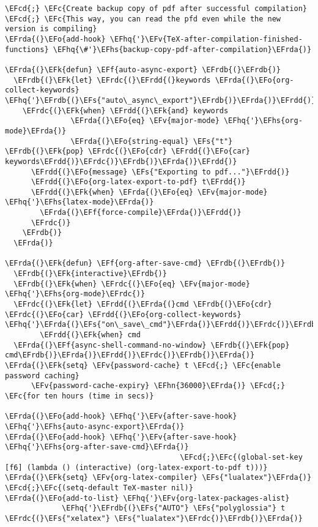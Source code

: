 \documentclass[a4wide,10pt]{article}
\newcommand{\EFc}[1]{\textcolor{EFc}{#1}} %
\newcommand{\EFcd}[1]{\textcolor{EFcd}{#1}} %
\newcommand{\EFs}[1]{\textcolor{EFs}{#1}} %
\newcommand{\EFk}[1]{\textcolor{EFk}{#1}} %
\newcommand{\EFf}[1]{\textcolor{EFf}{#1}} %
\newcommand{\EFv}[1]{\textcolor{EFv}{#1}} %
\newcommand{\EFo}[1]{\textcolor{EFo}{#1}} %
\newcommand{\EFhn}[1]{\textcolor{EFhn}{\textbf{#1}}} %
\newcommand{\EFhq}[1]{\textcolor{EFhq}{#1}} %
\newcommand{\EFhs}[1]{\textcolor{EFhs}{#1}} %
\newcommand{\EFrda}[1]{\textcolor{EFrda}{#1}} %
\newcommand{\EFrdb}[1]{\textcolor{EFrdb}{#1}} %
\newcommand{\EFrdc}[1]{\textcolor{EFrdc}{#1}} %
\newcommand{\EFrdd}[1]{\textcolor{EFrdd}{#1}} %
\begin{document}
\begin{Code}
\begin{Verbatim}
\EFcd{;} \EFc{Create backup copy of pdf after successful compilation}
\EFcd{;} \EFc{This way, you can read the pfd even while the new version is compiling}
\EFrda{(}\EFo{add-hook} \EFhq{'}\EFv{TeX-after-compilation-finished-functions} \EFhq{\#'}\EFhs{backup-copy-pdf-after-compilation}\EFrda{)}

\EFrda{(}\EFk{defun} \EFf{auto-async-export} \EFrdb{(}\EFrdb{)}
  \EFrdb{(}\EFk{let} \EFrdc{(}\EFrdd{(}keywords \EFrda{(}\EFo{org-collect-keywords} \EFhq{'}\EFrdb{(}\EFs{"auto\_async\_export"}\EFrdb{)}\EFrda{)}\EFrdd{)}\EFrdc{)}
    \EFrdc{(}\EFk{when} \EFrdd{(}\EFk{and} keywords
               \EFrda{(}\EFo{eq} \EFv{major-mode} \EFhq{'}\EFhs{org-mode}\EFrda{)}
               \EFrda{(}\EFo{string-equal} \EFs{"t"} \EFrdb{(}\EFk{pop} \EFrdc{(}\EFo{cdr} \EFrdd{(}\EFo{car} keywords\EFrdd{)}\EFrdc{)}\EFrdb{)}\EFrda{)}\EFrdd{)}
      \EFrdd{(}\EFo{message} \EFs{"Exporting to pdf..."}\EFrdd{)}
      \EFrdd{(}\EFo{org-latex-export-to-pdf} t\EFrdd{)}
      \EFrdd{(}\EFk{when} \EFrda{(}\EFo{eq} \EFv{major-mode} \EFhq{'}\EFhs{latex-mode}\EFrda{)}
        \EFrda{(}\EFf{force-compile}\EFrda{)}\EFrdd{)}
      \EFrdc{)}
    \EFrdb{)}
  \EFrda{)}

\EFrda{(}\EFk{defun} \EFf{org-after-save-cmd} \EFrdb{(}\EFrdb{)}
  \EFrdb{(}\EFk{interactive}\EFrdb{)}
  \EFrdb{(}\EFk{when} \EFrdc{(}\EFo{eq} \EFv{major-mode} \EFhq{'}\EFhs{org-mode}\EFrdc{)}
  \EFrdc{(}\EFk{let} \EFrdd{(}\EFrda{(}cmd \EFrdb{(}\EFo{cdr} \EFrdc{(}\EFo{car} \EFrdd{(}\EFo{org-collect-keywords} \EFhq{'}\EFrda{(}\EFs{"on\_save\_cmd"}\EFrda{)}\EFrdd{)}\EFrdc{)}\EFrdb{)}\EFrda{)}\EFrdd{)}
        \EFrdd{(}\EFk{when} cmd
  \EFrda{(}\EFf{async-shell-command-no-window} \EFrdb{(}\EFk{pop} cmd\EFrdb{)}\EFrda{)}\EFrdd{)}\EFrdc{)}\EFrdb{)}\EFrda{)}
\EFrda{(}\EFk{setq} \EFv{password-cache} t \EFcd{;} \EFc{enable password caching}
      \EFv{password-cache-expiry} \EFhn{36000}\EFrda{)} \EFcd{;} \EFc{for ten hours (time in secs)}

\EFrda{(}\EFo{add-hook} \EFhq{'}\EFv{after-save-hook} \EFhq{'}\EFhs{auto-async-export}\EFrda{)}
\EFrda{(}\EFo{add-hook} \EFhq{'}\EFv{after-save-hook} \EFhq{'}\EFhs{org-after-save-cmd}\EFrda{)}
                                        \EFcd{;}\EFc{(global-set-key [f6] (lambda () (interactive) (org-latex-export-to-pdf t)))}
\EFrda{(}\EFk{setq} \EFv{org-latex-compiler} \EFs{"lualatex"}\EFrda{)}
\EFcd{;}\EFc{(setq-default TeX-master nil)}
\EFrda{(}\EFo{add-to-list} \EFhq{'}\EFv{org-latex-packages-alist}
             \EFhq{'}\EFrdb{(}\EFs{"AUTO"} \EFs{"polyglossia"} t \EFrdc{(}\EFs{"xelatex"} \EFs{"lualatex"}\EFrdc{)}\EFrdb{)}\EFrda{)}


\end{Verbatim}
\end{Code}
\end{document}
